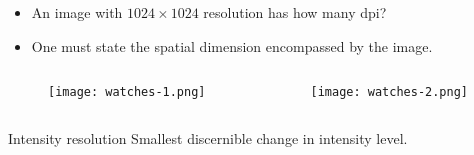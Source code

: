 
\begin{frame}
\begin{itemize}
\item An image with $1024\times 1024$ resolution has how many dpi?
\item One must state the spatial dimension encompassed by the image.
\end{itemize}
\end{frame}


\begin{frame}
\begin{columns}
\begin{column}{.5\textwidth}
\begin{figure}
\texttt{[image: watches-1.png]}
\end{figure}
\end{column}
\begin{column}{.5\textwidth}
\begin{figure}
\texttt{[image: watches-2.png]}
\end{figure}
\end{column}
\end{columns}
\end{frame}


\begin{frame}
\begin{block}{Intensity resolution}
Smallest discernible change in intensity level.
\end{block}
\end{frame}


